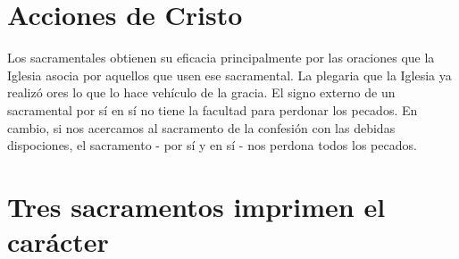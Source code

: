 \documentclass{article}
\begin{document}
    \section*{Acciones de Cristo}
       Los sacramentales obtienen su eficacia principalmente por las oraciones que la Iglesia asocia por aquellos que usen ese sacramental. La plegaria que la Iglesia ya realizó ores lo que lo hace vehículo de la gracia. El signo externo de un sacramental por sí en sí no tiene la facultad para perdonar los pecados. En cambio, si nos acercamos al sacramento de la confesión con las debidas dispociones, el sacramento - por sí y en sí - nos perdona todos los pecados. 
    \section*{Tres sacramentos imprimen el carácter}
\end{document}
